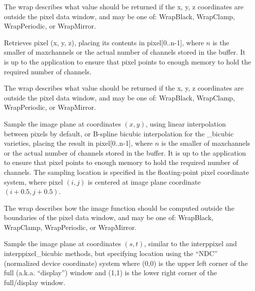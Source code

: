 The {\cf wrap} describes what value should be returned if the {\cf x, y, z}
coordinates are outside the pixel data window, and may be one of:
{\cf WrapBlack}, {\cf WrapClamp}, {\cf WrapPeriodic}, or {\cf WrapMirror}.
\apiend


Retrieves pixel ({\cf x, y, z}), placing its contents in
{\cf pixel[0..n-1]}, where $n$ is the smaller of {\cf maxchannels}
or the actual number of channels stored in the buffer.  It is up to
the application to ensure that {\cf pixel} points to enough memory
to hold the required number of channels.

The {\cf wrap} describes what value should be returned if the {\cf x, y, z}
coordinates are outside the pixel data window, and may be one of:
{\cf WrapBlack}, {\cf WrapClamp}, {\cf WrapPeriodic}, or {\cf WrapMirror}.
\apiend

Sample the image plane at coordinates $(x,y)$,
using linear interpolation between pixels by default, or B-spline
bicubic interpolation for the {\cf _bicubic} varieties, placing the result in
{\cf pixel[0..n-1]}, where $n$ is the smaller of {\cf maxchannels}
or the actual number of channels stored in the buffer.  It is up to
the application to ensure that {\cf pixel} points to enough memory
to hold the required number of channels.
The sampling location is specified in the floating-point pixel coordinate
system, where pixel $(i,j)$ is centered at image plane coordinate $(i+0.5,
j+0.5)$.

The {\cf wrap} describes how the image function should be computed
outside the boundaries of the pixel data window, and may be one of:
{\cf WrapBlack}, {\cf WrapClamp}, {\cf WrapPeriodic}, or {\cf WrapMirror}.
\apiend

Sample the image plane at coordinates $(s,t)$, similar to the
{\cf\small interppixel} and {\cf\small interppixel_bicubic} methods, but
specifying location using the ``NDC'' (normalized
device coordinate) system where (0,0) is the upper left corner of the full
(a.k.a. ``display'') window and (1,1) is the lower right corner of the
full/display window.
\apiend

